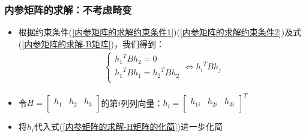 \documentclass[aspectratio=43]{beamer}
\begin{document}
	\begin{frame}
		\frametitle{内参矩阵的求解：不考虑畸变}
		\begin{itemize}
			\item 	根据约束条件(\ref{内参矩阵的求解约束条件1})(\ref{内参矩阵的求解约束条件2})及式(\ref{内参矩阵的求解-B矩阵})，我们得到：\\
			\begin{align}
				\begin{cases}
					{h_1}^TBh_2=0\\
					{h_1}^TBh_1={h_2}^TBh_2\\
				\end{cases}\Leftrightarrow {h_i}^TBh_j \label{内参矩阵的求解-H矩阵的化简}
			\end{align}
			\item 令$H=\left[ \begin{matrix}
				h_1&		h_2&		h_3\\
			\end{matrix} \right] $的第$i$列列向量：$h_i=\left[ \begin{matrix}
				h_{1i}&		h_{2i}&		h_{3i}\\
			\end{matrix} \right] ^T$
			\item 将$h_i$代入式(\ref{内参矩阵的求解-H矩阵的化简})进一步化简	
		\end{itemize}
	\end{frame}	
	
\end{document}

